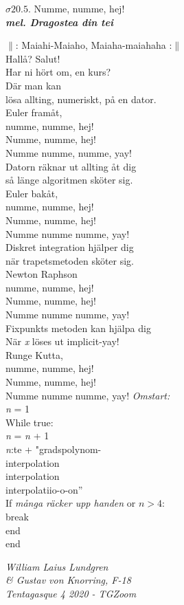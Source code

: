 \documentclass[a6paper,10pt]{article}
\newcommand{\mel}[1]{\small\textbf{\textit{mel. #1 \\}}}
\begin{document}
\begin{center}
\Large $\sigma20.5$. Numme, numme, hej!\\
\mel{Dragostea din tei} 
\end{center}
\small $\|$: Maiahi-Maiaho, Maiaha-maiahaha :$\|$
\vspace{5pt}\\
Hallå? Salut!\\
Har ni hört om, en kurs?\\
Där man kan\\
lösa allting, numeriskt, på en dator.
\vspace{5pt}\\
Euler framåt,\\
numme, numme, hej!\\
Numme, numme, hej!\\
Numme numme, numme, yay!\\
Datorn räknar ut allting åt dig\\
så länge algoritmen sköter sig.
\vspace{5pt}\\
Euler bakåt,\\
numme, numme, hej!\\
Numme, numme, hej!\\
Numme numme numme, yay!\\
Diskret integration hjälper dig\\
när trapetsmetoden sköter sig.
\vspace{5pt}\\
Newton Raphson\\
numme, numme, hej!\\
Numme, numme, hej!\\
Numme numme numme, yay!\\
Fixpunkts metoden kan hjälpa dig\\
När \textit{x} löses ut implicit-yay!
\vspace{5pt}\\
Runge Kutta,\\
numme, numme, hej!\\
Numme, numme, hej!\\
Numme numme numme, yay!
\setlength{\oddsidemargin}{-0.47in}
\noindent
\textit{Omstart:}
\vspace{3pt}\\
\textit{n} = 1\\
While true:\\
\indent
    \textit{n} = \textit{n} + 1\\
    \indent \textit{n}:te + "gradspolynom-\\
    \indent interpolation\\
    \indent interpolation\\
    \indent interpolatiio-o-on”\\
    \indent If \textit{många räcker upp handen} or $n>4$:\\
    \indent \indent break\\
    \indent end\\
end
    


\begin{flushright}
\textit{William Laius Lundgren\\ \& Gustav von Knorring, F-18\\Tentagasque 4 2020 - TGZoom}
\end{flushright}
\end{document}
